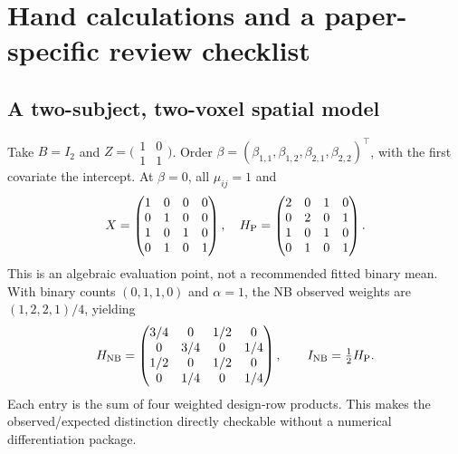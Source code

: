 \documentclass[11pt,a4paper]{article}
\numberwithin{equation}{section}
\begin{document}
\section{Hand calculations and a paper-specific review checklist}

\subsection{A two-subject, two-voxel spatial model}
Take $B=I_2$ and
$Z=\bigl(\begin{smallmatrix}1&0\\1&1\end{smallmatrix}\bigr)$.
Order $\beta=(\beta_{1,1},\beta_{1,2},\beta_{2,1},\beta_{2,2})^\top$,
with the first covariate the intercept.
At $\beta=0$, all $\mu_{ij}=1$ and
\[
 X=\begin{pmatrix}1&0&0&0\\0&1&0&0\\1&0&1&0\\0&1&0&1\end{pmatrix},
 \quad
 H_{\rm P}=
 \begin{pmatrix}2&0&1&0\\0&2&0&1\\1&0&1&0\\0&1&0&1\end{pmatrix}.
\]
This is an algebraic evaluation point, not a recommended fitted
binary mean. With binary counts $(0,1,1,0)$ and $\alpha=1$,
the NB observed weights are $(1,2,2,1)/4$, yielding
\[
 H_{\rm NB}=
 \begin{pmatrix}
 3/4&0&1/2&0\\0&3/4&0&1/4\\1/2&0&1/2&0\\0&1/4&0&1/4
 \end{pmatrix},
 \qquad I_{\rm NB}=\tfrac12H_{\rm P}.
\]
Each entry is the sum of four weighted design-row products.
This makes the observed/expected distinction directly checkable
without a numerical differentiation package.
\end{document}
